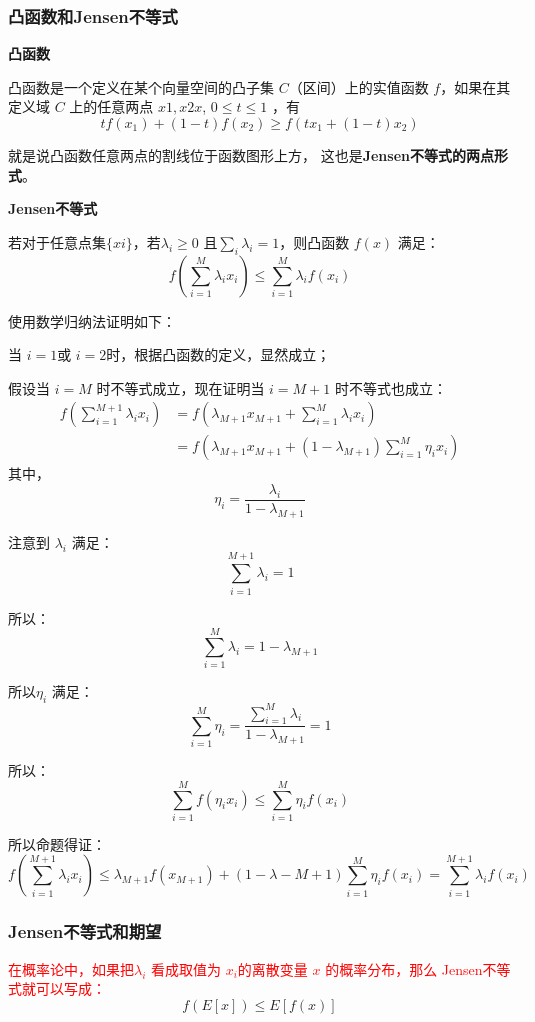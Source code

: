 \documentclass[12pt]{article}
\begin{document}
\subsubsection{凸函数和Jensen不等式\cite{Understanding_Jensen_Nnequality_And_Proof}}
\textbf{凸函数}

凸函数是一个定义在某个向量空间的凸子集 $C$（区间）上的实值函数 $f$，如果在其定义域 $C$ 上的任意两点 $x1,x2x $, $0 \le t \le 1 $ ，有
$$
tf(x_1) + (1-t)f(x_2) \ge f(tx_1 + (1-t)x_2)
$$

就是说凸函数任意两点的割线位于函数图形上方， 这也是\textbf{Jensen不等式的两点形式}。

\textbf{Jensen不等式}

若对于任意点集$\{xi\}$，若$\lambda_i \ge 0$ 且$\sum_i\lambda_i = 1$，则凸函数 $f(x)$ 满足：
$$
f(\sum_{i=1}^{M}\lambda_ix_i) \le \sum_{i=1}^{M}\lambda_if(x_i)
$$

\begin{framed}  
\small{
使用数学归纳法证明如下：

当 $i=1$或 $i=2$时，根据凸函数的定义，显然成立；

假设当 $i=M$ 时不等式成立，现在证明当 $i=M+1$ 时不等式也成立：
\begin{align*}
f(\sum_{i=1}^{M+1}\lambda_ix_i) &= f(\lambda_{M+1}x_{M+1} + \sum_{i=1}^M\lambda_ix_i) \\
&= f(\lambda_{M+1}x_{M+1} + (1-\lambda_{M+1})\sum_{i=1}^M\eta_ix_i)
\end{align*}
其中，
$$
\eta_i = \frac{\lambda_i}{1 - \lambda_{M+1}}
$$

注意到 $\lambda_i$ 满足：
$$
\sum_{i=1}^{M+1}\lambda_i = 1
$$

所以：
$$
\sum_{i=1}^{M}\lambda_i = 1 - \lambda_{M+1}
$$

所以$\eta_i$ 满足：
$$
\sum_{i=1}^{M}\eta_i = \frac{\sum_{i=1}^{M}\lambda_i }{1 - \lambda_{M+1}} = 1
$$

所以：
$$
\sum_{i=1}^{M}f(\eta_ix_i) \le \sum_{i=1}^{M}\eta_if(x_i)
$$

所以命题得证：
$$
f(\sum_{i=1}^{M+1}\lambda_ix_i) \le \lambda_{M+1}f(x_{M+1}) + (1-\lambda-{M+1})\sum_{i=1}^{M}\eta_if(x_i) = \sum_{i=1}^{M+1}\lambda_if(x_i)
$$
}
\end{framed}

\subsubsection{Jensen不等式和期望}
\textcolor{red}{在概率论中，如果把$λ_i$ 看成取值为 $x_i$的离散变量 $x$ 的概率分布，那么 Jensen不等式就可以写成：}
$$
f(E[x]) \le E[f(x)]
$$
\end{document}
